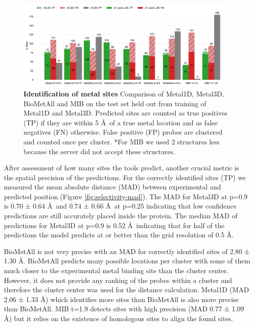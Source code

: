 \documentclass[ lineno,
  9pt]{elife}
\begin{document}
\begin{figure}
\hypertarget{fig:comparison}{%
\centering
\includegraphics{images/all_2coord_metal_1d_3d_min_biometall_comparison.jpg}
\caption{\textbf{Identification of metal sites} Comparison of Metal1D, Metal3D, BioMetAll and MIB on the test set held out from training of Metal1D and Metal3D. Predicted sites are counted as true positives (TP) if they are within 5 \AA\, of a true metal location and as false negatives (FN) otherwise. False positive (FP) probes are clustered and counted once per cluster. *For MIB we used 2 structures less because the server did not accept these structures.}\label{fig:comparison}
}
\end{figure}

After assessment of how many sites the tools predict, another crucial metric is the spatial precision of the predictions. For the correctly identified sites (TP) we measured the mean absolute distance (MAD) between experimental and predicted position (Figure \ref{fig:selectivity-mad}). The MAD for Metal3D at p=0.9 is 0.70 ± 0.64 \AA\, and 0.74 ± 0.66 \AA\, at p=0.25 indicating that low confidence predictions are still accurately placed inside the protein. The median MAD of predictions for Metal3D at p=0.9 is 0.52 \AA\, indicating that for half of the predictions the model predicts at or better than the grid resolution of 0.5 \AA .

BioMetAll is not very precise with an MAD for correctly identified sites of 2.80 ± 1.30 \AA . BioMetAll predicts many possible locations per cluster with some of them much closer to the experimental metal binding site than the cluster center. However, it does not provide any ranking of the probes within a cluster and therefore the cluster center was used for the distance calculation. Metal1D (MAD 2.06 ± 1.33 \AA ) which identifies more sites than BioMetAll is also more precise than BioMetAll. MIB t=1.9 detects sites with high precision (MAD 0.77 ± 1.09 \AA ) but it relies on the existence of homologous sites to align the found sites.
\end{document}
